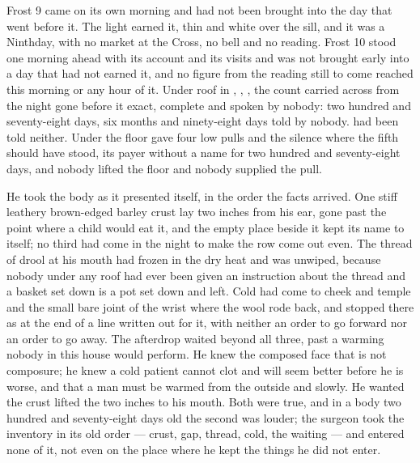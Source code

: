 
Frost 9 came on its own morning and had not been brought into the day that went before it. The light earned it, thin and white over the sill, and it was a Ninthday, with no market at the Cross, no bell and no reading. Frost 10 stood one morning ahead with its account and its visits and was not brought early into a day that had not earned it, and no figure from the reading still to come reached this morning or any hour of it. Under  roof in , , , the count carried across from the night gone before it exact, complete and spoken by nobody: two hundred and seventy-eight days, six months and ninety-eight days told by nobody.  had been told neither. Under the floor  gave four low pulls and the silence where the fifth should have stood, its payer without a name for two hundred and seventy-eight days, and nobody lifted the floor and nobody supplied the pull.

He took the body as it presented itself, in the order the facts arrived. One stiff leathery brown-edged barley crust lay two inches from his ear, gone past the point where a child would eat it, and the empty place beside it kept its name to itself; no third had come in the night to make the row come out even. The thread of drool at his mouth had frozen in the dry heat and was unwiped, because nobody under any roof had ever been given an instruction about the thread and a basket set down is a pot set down and left. Cold had come to cheek and temple and the small bare joint of the wrist where the wool rode back, and stopped there as at the end of a line written out for it, with neither an order to go forward nor an order to go away. The afterdrop waited beyond all three, past a warming nobody in this house would perform. He knew the composed face that is not composure; he knew a cold patient cannot clot and will seem better before he is worse, and that a man must be warmed from the outside and slowly. He wanted the crust lifted the two inches to his mouth. Both were true, and in a body two hundred and seventy-eight days old the second was louder; the surgeon took the inventory in its old order --- crust, gap, thread, cold, the waiting --- and entered none of it, not even on the place where he kept the things he did not enter.

